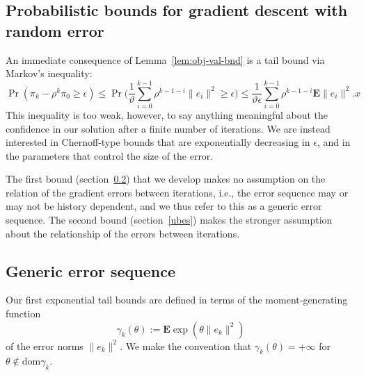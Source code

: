 \subsection{Probabilistic bounds for gradient descent with random error}
\label{sec:gradient-with-error}

An immediate consequence of Lemma~\ref{lem:obj-val-bnd} is a tail
bound via Markov's inequality:
\[
\Pr(\pi_k-\rho^k\pi_{0} \ge \epsilon) \leq
\Pr \Big( \frac{1}{\vartheta} 
\sum_{i=0}^{k-1}\rho^{k-1-i}\|e_{i}\|^2 \ge
\epsilon \Big)
\le  \frac{1}{\vartheta\epsilon}
\sum_{i=0}^{k-1}\rho^{k-1-i}\mathbf{E}\|e_{i}\|^2.
x\]
This inequality is too weak, however, to say anything meaningful about
the confidence in our solution after a finite number of iterations. We
are instead interested in Chernoff-type bounds that are exponentially
decreasing in $\epsilon$, and in the parameters that control the size
of the error.

The first bound (section~\ref{sec:gener-error-sequ}) that we develop
makes no assumption on the relation of the gradient errors between
iterations, i.e., the error sequence may or may not be history
dependent, and we thus refer to this as a generic error sequence. The
second bound (section~\ref{ubes}) makes the stronger assumption about
the relationship of the errors between iterations.

\subsection{Generic error sequence}\label{sec:gener-error-sequ}

Our first exponential tail bounds are defined in terms of the
moment-generating function
\begin{equation*}
\gamma_k(\theta) := \mathbf{E}\exp(\theta\|e_k\|^2)
\end{equation*}
of the error norms $\|e_k\|^2$. We make the convention that
$\gamma_k(\theta)=+\infty$ for $\theta \notin \text{dom}\gamma_k$.

